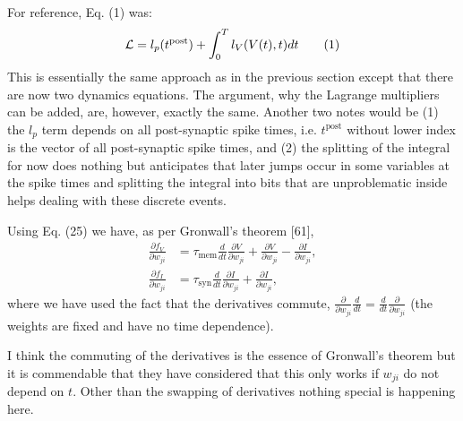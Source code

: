 \documentclass[a4paper]{article}
\newcommand{\blue}[1]{{\color{blue}#1}}
\begin{document}
For reference, Eq. \blue{(1)} was:
\blue{
  \begin{align} 
    {\cal L} = l_p(t^{\text{post}}) + \int_0^T l_V(V(t),t) dt \tag{1}
  \end{align}
}
This is essentially the same approach as in the previous section
except that there are now two dynamics equations. The argument, why the
Lagrange multipliers can be added, are, however, exactly the
same. Another two notes would be (1) the $l_p$ term depends on all
post-synaptic spike times, i.e. $t^{\text{post}}$ without lower index
is the vector of all post-synaptic spike times, and (2) the splitting
of the integral for now does nothing but anticipates that later jumps
occur in some variables at the spike times and splitting the integral
into bits that are unproblematic inside helps dealing with these
discrete events.

\blue{
  Using Eq. (25) we have, as per Gronwall’s theorem [61],
  \begin{align}
    \frac{\partial f_V}{\partial w_{ji}} &= \tau_{\text{mem}}
    \frac{d}{dt} \frac{\partial V}{\partial w_{ji}} + \frac{\partial
      V}{\partial w_{ji}} - \frac{\partial I}{\partial
      w_{ji}}, \tag{27a}  \\ 
    \frac{\partial f_I}{\partial w_{ji}} &= \tau_{\text{syn}}
    \frac{d}{dt} \frac{\partial I}{\partial w_{ji}} +\frac{\partial
      I}{\partial w_{ji}}, \tag{27b}
  \end{align}
  where we have used the fact that the derivatives commute,
  $\frac{\partial }{\partial w_{ji}} \frac{d}{dt} = \frac{d}{dt}
  \frac{\partial }{\partial w_{ji}}$ (the weights are fixed and have
  no time dependence). 
}

I think the commuting of the derivatives is the essence of Gronwall's
theorem but it is commendable that they have considered that this only
works if $w_{ji}$ do not depend on $t$. Other than the swapping of
derivatives nothing special is happening here.
\end{document}
